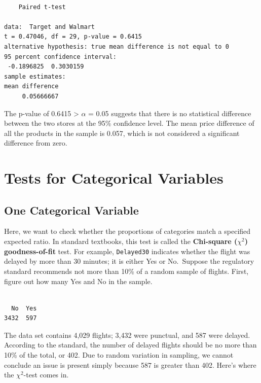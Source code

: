 \documentclass[
  letterpaper,
  DIV=11,
  numbers=noendperiod]{scrreprt}
\newenvironment{Shaded}{\begin{snugshade}}{\end{snugshade}}
\newcommand{\FunctionTok}[1]{\textcolor[rgb]{0.28,0.35,0.67}{#1}}
\newcommand{\NormalTok}[1]{\textcolor[rgb]{0.00,0.23,0.31}{#1}}
\newcommand{\SpecialCharTok}[1]{\textcolor[rgb]{0.37,0.37,0.37}{#1}}
\begin{document}
\begin{verbatim}

    Paired t-test

data:  Target and Walmart
t = 0.47046, df = 29, p-value = 0.6415
alternative hypothesis: true mean difference is not equal to 0
95 percent confidence interval:
 -0.1896825  0.3030159
sample estimates:
mean difference 
     0.05666667 
\end{verbatim}

The p-value of 0.6415 \textgreater{} \(\alpha\) = 0.05 suggests that
there is no statistical difference between the two stores at the 95\%
confidence level. The mean price difference of all the products in the
sample is 0.057, which is not considered a significant difference from
zero.

\section{Tests for Categorical
Variables}\label{tests-for-categorical-variables}

\subsection{One Categorical Variable}\label{sec-04-x2-gof-test}

Here, we want to check whether the proportions of categories match a
specified expected ratio. In standard textbooks, this test is called the
\textbf{Chi-square (}\(\chi^{2}\)\textbf{) goodness-of-fit} test. For
example, \texttt{Delayed30} indicates whether the flight was delayed by
more than 30 minutes; it is either Yes or No.~Suppose the regulatory
standard recommends not more than 10\% of a random sample of flights.
First, figure out how many Yes and No in the sample.

\begin{Shaded}
\end{Shaded}

\begin{verbatim}

  No  Yes 
3432  597 
\end{verbatim}

The data set contains 4,029 flights; 3,432 were punctual, and 587 were
delayed. According to the standard, the number of delayed flights should
be no more than 10\% of the total, or 402. Due to random variation in
sampling, we cannot conclude an issue is present simply because 587 is
greater than 402. Here's where the \(\chi^2\)-test comes in.
\end{document}
